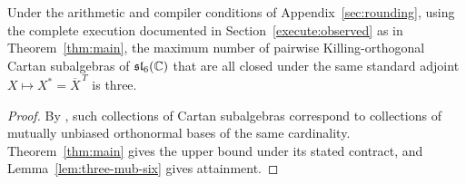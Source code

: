 \begin{corollary}
\label{cor:adjoint-cartan}
Under the arithmetic and compiler conditions of
Appendix~\ref{sec:rounding}, using the complete execution documented in
Section~\ref{execute:observed} as in Theorem~\ref{thm:main},
the maximum number of pairwise Killing-orthogonal Cartan subalgebras of
$\mathfrak{sl}_6(\mathbb C)$ that are all closed under the same standard adjoint
$X\mapsto X^*=\overline X^{\,T}$ is three.
\end{corollary}

\begin{proof}
By \cite[Theorem~5.2]{BoykinSitharamTiepWocjan2005}, such collections of
Cartan subalgebras correspond to collections of mutually unbiased
orthonormal bases of the same cardinality. Theorem~\ref{thm:main} gives the
upper bound under its stated contract, and Lemma~\ref{lem:three-mub-six}
gives attainment.
\end{proof}
